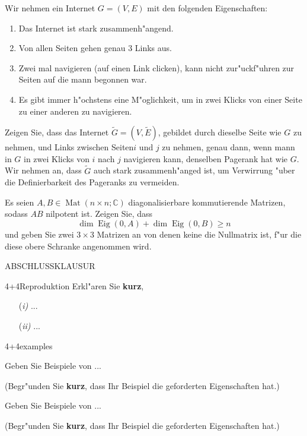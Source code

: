 \documentclass[a4paper]{article}
\begin{document}
\begin{klaufg}{8}{}
Wir nehmen ein Internet $G = (V, E)$ mit den folgenden Eigenschaften:
\begin{enumerate}
\item
Das Internet ist stark zusammenh"angend.
\item
Von allen Seiten gehen genau $3$ Links aus.
\item
Zwei mal navigieren (auf einen Link clicken), kann nicht zur"uckf"uhren zur Seiten auf die mann begonnen war.
\item
Es gibt immer h"ochstens eine M"oglichkeit, um in zwei Klicks von einer Seite zu einer anderen zu navigieren.
\end{enumerate}
Zeigen Sie, dass das Internet $\tilde{G} = (V, \tilde{E})$, gebildet durch dieselbe Seite wie $G$ zu nehmen, und Links zwischen Seiten$i$ und $j$ zu nehmen, genau dann, wenn mann in $G$ in zwei Klicks von $i$ nach $j$ navigieren kann, denselben Pagerank hat wie $G$. Wir nehmen an, dass $\tilde{G}$ auch stark zusammenh"anged ist, um Verwirrung "uber die Definierbarkeit des Pageranks zu vermeiden.
\end{klaufg}

\begin{klaufg}{8}{}
Es seien $A, B \in \operatorname{Mat}(n \times n ; \mathbb{C})$ diagonalisierbare kommutierende Matrizen, sodass $AB$ nilpotent ist. Zeigen Sie, dass
\[
\dim \operatorname{Eig}(0, A) + \dim \operatorname{Eig}(0, B) \geq n
\]
und geben Sie zwei $3 \times 3$ Matrizen an von denen keine die Nullmatrix ist, f"ur die diese obere Schranke angenommen wird.
\end{klaufg}

\pagebreak

ABSCHLUSSKLAUSUR

\begin{klaufg}{4+4}{Reproduktion}
  Erkl"aren Sie {\bfseries\sffamily kurz},

\begin{enumerate} %
\item[(\it i)] ...
   \vfill
\item[(\it ii)] ...
 \vfill
\end{enumerate}

\end{klaufg}

\pagebreak
\begin{klaufg}{4+4}{examples}


  Geben Sie Beispiele von ...

  (Begr"unden Sie {\bfseries\sffamily kurz}, dass Ihr Beispiel die
  geforderten Eigenschaften hat.)
  \pagebreak
  
    Geben Sie Beispiele von ...
  
  (Begr"unden Sie {\bfseries\sffamily kurz}, dass Ihr Beispiel die
  geforderten Eigenschaften hat.)

\end{klaufg}
\end{document}

